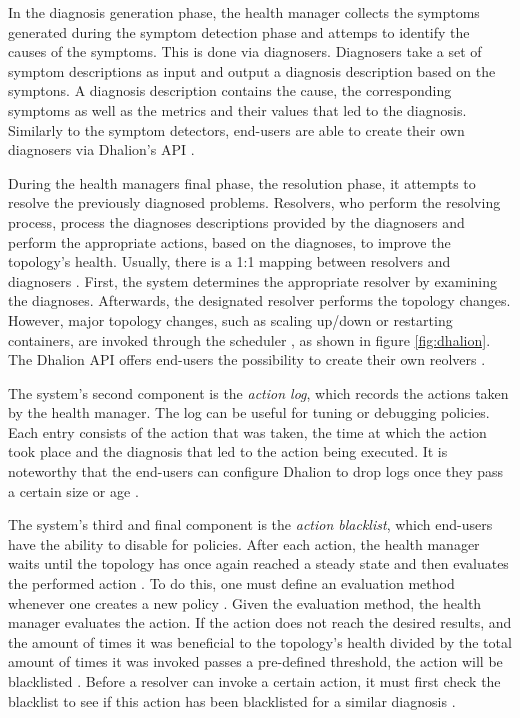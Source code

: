         \quad In the diagnosis generation phase, the health manager collects the symptoms generated during the symptom detection phase and attemps to identify the causes 
        of the symptoms. 
        This is done via diagnosers. Diagnosers take a set of symptom descriptions as input and output a diagnosis description based on the symptons. 
        A diagnosis description contains the cause, the corresponding symptoms as well as the metrics and their values that led to the diagnosis.
        Similarly to the symptom detectors, end-users are able to create their own diagnosers via Dhalion's API \cite{dhalion}.

        \quad During the health managers final phase, the resolution phase, it attempts to resolve the previously diagnosed problems.
        Resolvers, who perform the resolving process, process the diagnoses descriptions provided by the diagnosers and perform the 
        appropriate actions, based on the diagnoses, to improve the topology's health. Usually, there is a 1:1 mapping between resolvers and diagnosers \cite[p. 4]{dhalion}.
        First, the system determines the appropriate resolver by examining the diagnoses. Afterwards, the designated resolver performs the topology changes.
        However, major topology changes, such as scaling up/down or restarting containers, are invoked through the scheduler \cite[p. 5]{dhalion}, as shown in figure \ref{fig:dhalion}.
        The Dhalion API offers end-users the possibility to create their own reolvers \cite{dhalion}.

        \quad The system's second component is the \textit{action log}, which records the actions taken by the health manager.
        The log can be useful for tuning or debugging policies. Each entry consists of the action that was taken, the time at which the action took place and the diagnosis 
        that led to the action being executed. 
        It is noteworthy that the end-users can configure Dhalion to drop logs once they pass a certain size or age \cite[p. 5]{dhalion}.

        \quad The system's third and final component is the \textit{action blacklist}, which end-users have the ability to disable for policies.
        After each action, the health manager waits until the topology has once again reached a steady state and then evaluates the performed action \cite[p. 5]{dhalion}.
        To do this, one must define an evaluation method whenever one creates a new policy \cite[p. 5]{dhalion}. Given the evaluation method, the health manager evaluates the action.
        If the action does not reach the desired results, and the amount of times it was beneficial to the topology's health divided by the total amount of times it 
        was invoked passes a pre-defined threshold, the action will be blacklisted \cite[p. 5]{dhalion}.
        Before a resolver can invoke a certain action, it must first check the blacklist to see if this action has been blacklisted for a similar diagnosis \cite[p. 5]{dhalion}.

